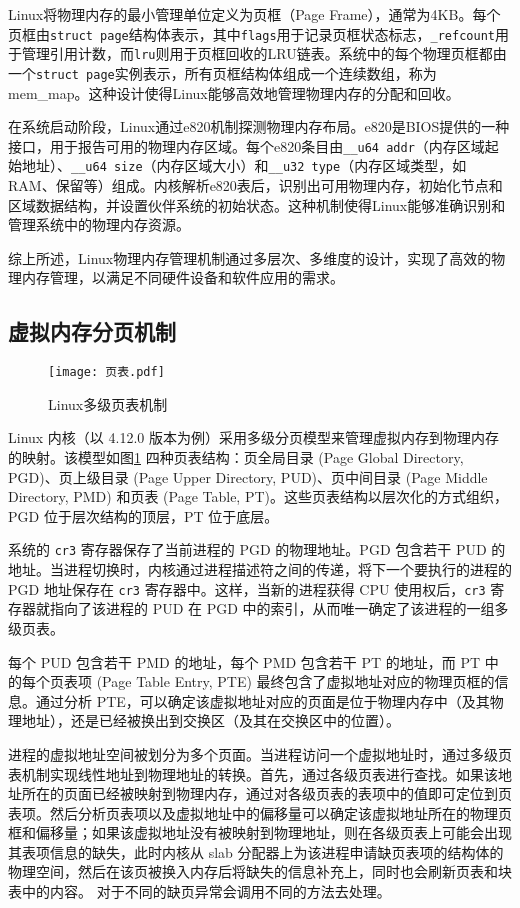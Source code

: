Linux将物理内存的最小管理单位定义为页框（Page Frame），通常为4KB。每个页框由\texttt{struct page}结构体表示，其中\texttt{flags}用于记录页框状态标志，\texttt{\_refcount}用于管理引用计数，而\texttt{lru}则用于页框回收的LRU链表。系统中的每个物理页框都由一个\texttt{struct page}实例表示，所有页框结构体组成一个连续数组，称为mem\_map。这种设计使得Linux能够高效地管理物理内存的分配和回收。

在系统启动阶段，Linux通过e820机制探测物理内存布局。e820是BIOS提供的一种接口，用于报告可用的物理内存区域。每个e820条目由\texttt{\_\_u64 addr}（内存区域起始地址）、\texttt{\_\_u64 size}（内存区域大小）和\texttt{\_\_u32 type}（内存区域类型，如RAM、保留等）组成。内核解析e820表后，识别出可用物理内存，初始化节点和区域数据结构，并设置伙伴系统的初始状态。这种机制使得Linux能够准确识别和管理系统中的物理内存资源。

综上所述，Linux物理内存管理机制通过多层次、多维度的设计，实现了高效的物理内存管理，以满足不同硬件设备和软件应用的需求。

\subsection{虚拟内存分页机制}

\begin{figure}[h]
    \centering
    \texttt{[image: 页表.pdf]}
    \caption{Linux多级页表机制}
    \label{页表}
\end{figure}

Linux 内核（以 4.12.0 版本为例）采用多级分页模型来管理虚拟内存到物理内存的映射。该模型如图\ref{页表} 四种页表结构：页全局目录 (Page Global Directory, PGD)、页上级目录 (Page Upper Directory, PUD)、页中间目录 (Page Middle Directory, PMD) 和页表 (Page Table, PT)。这些页表结构以层次化的方式组织，PGD 位于层次结构的顶层，PT 位于底层。

系统的 \texttt{cr3} 寄存器保存了当前进程的 PGD 的物理地址。PGD 包含若干 PUD 的地址。当进程切换时，内核通过进程描述符之间的传递，将下一个要执行的进程的 PGD 地址保存在 \texttt{cr3} 寄存器中。这样，当新的进程获得 CPU 使用权后，\texttt{cr3} 寄存器就指向了该进程的 PUD 在 PGD 中的索引，从而唯一确定了该进程的一组多级页表。

每个 PUD 包含若干 PMD 的地址，每个 PMD 包含若干 PT 的地址，而 PT 中的每个页表项 (Page Table Entry, PTE) 最终包含了虚拟地址对应的物理页框的信息。通过分析 PTE，可以确定该虚拟地址对应的页面是位于物理内存中（及其物理地址），还是已经被换出到交换区（及其在交换区中的位置）。

进程的虚拟地址空间被划分为多个页面。当进程访问一个虚拟地址时，通过多级页表机制实现线性地址到物理地址的转换。首先，通过各级页表进行查找。如果该地址所在的页面已经被映射到物理内存，通过对各级页表的表项中的值即可定位到页表项。然后分析页表项以及虚拟地址中的偏移量可以确定该虚拟地址所在的物理页框和偏移量；如果该虚拟地址没有被映射到物理地址，则在各级页表上可能会出现其表项信息的缺失，此时内核从 slab 分配器上为该进程申请缺页表项的结构体的物理空间，然后在该页被换入内存后将缺失的信息补充上，同时也会刷新页表和块表中的内容。 对于不同的缺页异常会调用不同的方法去处理。

